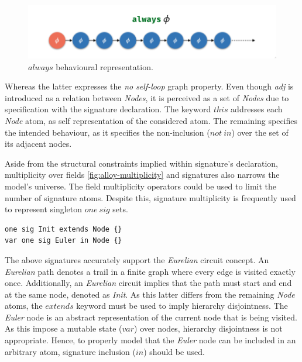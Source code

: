 \begin{figure}[H]
    \centering
    \includegraphics[width=0.6\linewidth]{images/alloy_always.png}
    \caption{$always$ behavioural representation.}
    \label{fig:alloy-always}
\end{figure}

Whereas the latter expresses the \textit{no self-loop} graph property. Even though \textit{adj} is introduced as a relation between \textit{Nodes}, it is perceived as a set of \textit{Nodes} due to specification with the signature declaration. The keyword $this$ addresses each \textit{Node} atom, as self representation of the considered atom. The remaining specifies the intended behaviour, as it specifies the non-inclusion ($not\ in$) over the set of its adjacent nodes.


Aside from the structural constraints implied within signature's declaration, multiplicity over fields \ref{fig:alloy-multiplicity} and signatures also narrows the model's universe. The field multiplicity operators could be used to limit the number of signature atoms. Despite this, signature multiplicity is frequently used to represent singleton $one\ sig$ sets.

\begin{lstlisting}[title={\textit{Node} signature hierarchy.}, otherkeywords = {one, abstract, sig, module, var, set, fact, extends, no, in}, floatplacement=H]
one sig Init extends Node {}
var one sig Euler in Node {}
\end{lstlisting}

The above signatures accurately support the \textit{Eurelian} circuit concept. An \textit{Eurelian} path denotes a trail in a finite graph where every edge is visited exactly once. Additionally, an \textit{Eurelian} circuit implies that the path must start and end at the same node, denoted as \textit{Init}. As this latter differs from the remaining \textit{Node} atoms, the $extends$ keyword must be used to imply hierarchy disjointness. The \textit{Euler} node is an abstract representation of the current node that is being visited. As this impose a mutable state ($var$) over nodes, hierarchy disjointness is not appropriate. Hence, to properly model that the \textit{Euler} node can be included in an arbitrary atom, signature inclusion ($in$) should be used.


